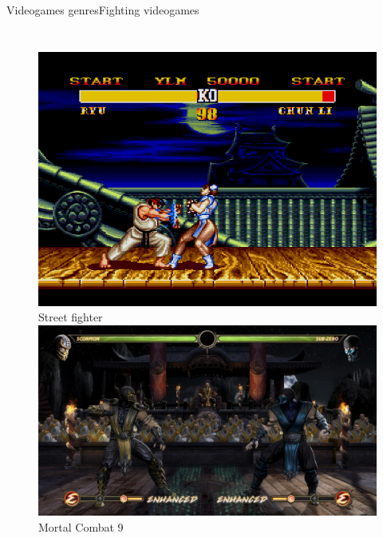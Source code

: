 \documentclass[10pt,compress]{beamer} %
\begin{document}
\begin{frame}{Videogames genres}{Fighting videogames}
\begin{columns}
   	 	\begin{figure}[t]
		\begin{center}
		    \includegraphics[width=0.9\linewidth]{figs/sf}\\Street fighter\\\smallskip
		    \includegraphics[width=0.9\linewidth]{figs/mortalcombat9}\\Mortal Combat 9
		\end{center}
   	 	\end{figure}
    \end{columns}
\end{frame}
\end{document}
